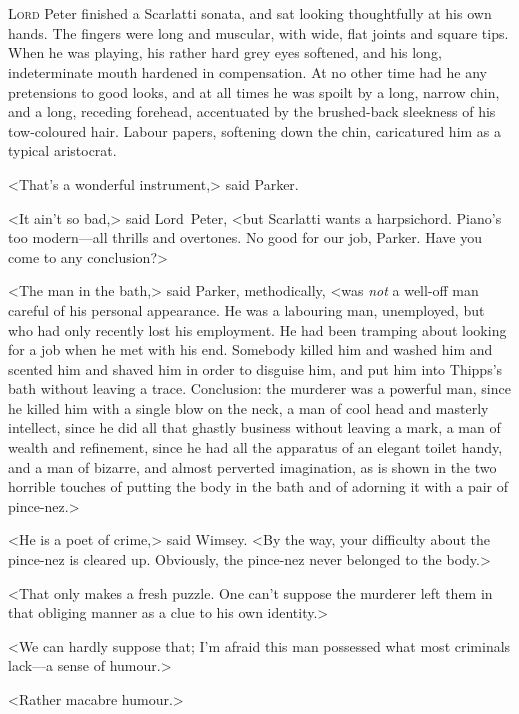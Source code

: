 \chapter[Chapter \thechapter]{}
\lettrine{L}{ord} Peter finished a Scarlatti sonata, and sat looking thoughtfully at his own hands. The fingers were long and muscular, with wide, flat joints and square tips. When he was playing, his rather hard grey eyes softened, and his long, indeterminate mouth hardened in compensation. At no other time had he any pretensions to good looks, and at all times he was spoilt by a long, narrow chin, and a long, receding forehead, accentuated by the brushed-back sleekness of his tow-coloured hair. Labour papers, softening down the chin, caricatured him as a typical aristocrat.

<That's a wonderful instrument,> said Parker.

<It ain't so bad,> said Lord~Peter, <but Scarlatti wants a harpsichord. Piano's too modern—all thrills and overtones. No good for our job, Parker. Have you come to any conclusion?>

<The man in the bath,> said Parker, methodically, <was \emph{not} a well-off man careful of his personal appearance. He was a labouring man, unemployed, but who had only recently lost his employment. He had been tramping about looking for a job when he met with his end. Somebody killed him and washed him and scented him and shaved him in order to disguise him, and put him into Thipps's bath without leaving a trace. Conclusion: the murderer was a powerful man, since he killed him with a single blow on the neck, a man of cool head and masterly intellect, since he did all that ghastly business without leaving a mark, a man of wealth and refinement, since he had all the apparatus of an elegant toilet handy, and a man of bizarre, and almost perverted imagination, as is shown in the two horrible touches of putting the body in the bath and of adorning it with a pair of pince-nez.>

<He is a poet of crime,> said Wimsey. <By the way, your difficulty about the pince-nez is cleared up. Obviously, the pince-nez never belonged to the body.>

<That only makes a fresh puzzle. One can't suppose the murderer left them in that obliging manner as a clue to his own identity.>

<We can hardly suppose that; I'm afraid this man possessed what most criminals lack—a sense of humour.>

<Rather macabre humour.>

